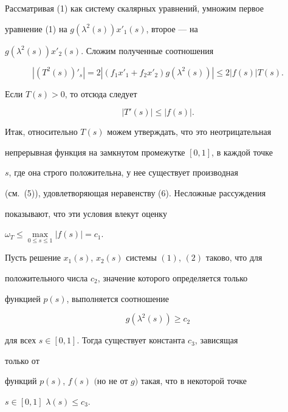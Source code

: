 \begin{pf} 


Рассматривая (1) как систему скалярных уравнений, умножим первое 


уравнение (1) на $g(\lambda^2(s))x'_1(s)$, второе --- на 


$g(\lambda^2(s))x'_2(s)$. Сложим полученные соотношения 


$$ 


|(T^2(s))'_s|=2|(f_1x'_1+f_2x'_2)g(\lambda^2(s))|\le 


2|f(s)|T(s). 


$$ 


Если $T(s)>0$, то отсюда следует 


\begin{equation} 


|T'(s)|\le|f(s)|. 


\end{equation} 


Итак, относительно $T(s)$ можем утверждать, что это неотрицательная 


непрерывная функция на замкнутом промежутке $[0,1]$, в каждой точке 


$s$, где она строго положительна, у нее существует производная 


(см.~(5)), удовлетворяющая неравенству (6). Несложные рассуждения 


показывают, что эти условия влекут оценку 


$\omega_T\le\max\limits_{0\le s\le 1}|f(s)|=c_1$. 


\end{pf} 


 


\begin{lem} 


Пусть решение $x_1(s)$, $x_2(s)$ системы $(1)$, $(2)$ таково, что для 


положительного числа $c_2$, значение которого определяется только 


функцией $p(s)$, выполняется соотношение 


\begin{equation} 


g(\lambda^2(s))\ge c_2 


\end{equation} 


для всех $s\in[0,1]$. Тогда существует константа $c_3$, зависящая 


только от 


функций $p(s)$, $f(s)$ $($но не от $g)$ такая, что в некоторой точке 


$s\in[0,1]$\; $\lambda(s)\le c_3$. 


\end{lem} 


